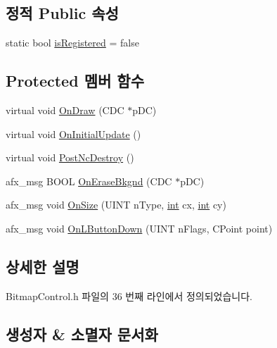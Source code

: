 \subsection*{정적 Public 속성}
\begin{DoxyCompactItemize}
\item 
static bool \mbox{\hyperlink{class_bitmap_control_acd16ac02d48f1201fc90470b6e29c7fe}{is\+Registered}} = false
\end{DoxyCompactItemize}
\subsection*{Protected 멤버 함수}
\begin{DoxyCompactItemize}
\item 
virtual void \mbox{\hyperlink{class_bitmap_control_a76ead24c70d33421148716a39cf3a17f}{On\+Draw}} (C\+DC $\ast$p\+DC)
\item 
virtual void \mbox{\hyperlink{class_bitmap_control_a532fd9e0bd31674589a224737960bfc0}{On\+Initial\+Update}} ()
\item 
virtual void \mbox{\hyperlink{class_bitmap_control_aed7e031df3fd65a4325ea9bf7da5bdc3}{Post\+Nc\+Destroy}} ()
\item 
afx\+\_\+msg B\+O\+OL \mbox{\hyperlink{class_bitmap_control_aea73d6e790bb4828eb230c3cd66e5e0b}{On\+Erase\+Bkgnd}} (C\+DC $\ast$p\+DC)
\item 
afx\+\_\+msg void \mbox{\hyperlink{class_bitmap_control_ac0e60f98809d78a38d5d35942c1bfb2c}{On\+Size}} (U\+I\+NT n\+Type, \mbox{\hyperlink{_util_8cpp_a0ef32aa8672df19503a49fab2d0c8071}{int}} cx, \mbox{\hyperlink{_util_8cpp_a0ef32aa8672df19503a49fab2d0c8071}{int}} cy)
\item 
afx\+\_\+msg void \mbox{\hyperlink{class_bitmap_control_a2958d0209f702d4207d10797c8aa86bd}{On\+L\+Button\+Down}} (U\+I\+NT n\+Flags, C\+Point point)
\end{DoxyCompactItemize}


\subsection{상세한 설명}


Bitmap\+Control.\+h 파일의 36 번째 라인에서 정의되었습니다.



\subsection{생성자 \& 소멸자 문서화}
\mbox{\label{class_bitmap_control_aec3c1d06a6cfc809eabfbd4217d90a8b}} 

